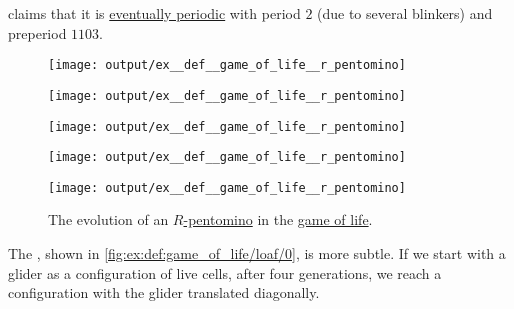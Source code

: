 \begin{example}
\begin{thmenum}
    \cite{ConwayLife:r_pentomino} claims that it is \hyperref[def:dynamical_system_eventual_periodicity]{eventually periodic} with period \( 2 \) (due to several blinkers) and preperiod \( 1103 \).

    \begin{figure}[!ht]
      \begin{subcaptionblock}{0.15\textwidth}
        \centering
        \texttt{[image: output/ex\_\_def\_\_game\_of\_life\_\_r\_pentomino]}
        \caption{\( t = 0 \)}\label{fig:ex:def:game_of_life/r_pentomino/0}
      \end{subcaptionblock}
      \hfill
      \begin{subcaptionblock}{0.15\textwidth}
        \centering
        \texttt{[image: output/ex\_\_def\_\_game\_of\_life\_\_r\_pentomino]}
        \caption{\( t = 1 \)}\label{fig:ex:def:game_of_life/r_pentomino/1}
      \end{subcaptionblock}
      \hfill
      \begin{subcaptionblock}{0.15\textwidth}
        \centering
        \texttt{[image: output/ex\_\_def\_\_game\_of\_life\_\_r\_pentomino]}
        \caption{\( t = 2 \)}\label{fig:ex:def:game_of_life/r_pentomino/2}
      \end{subcaptionblock}
      \hfill
      \begin{subcaptionblock}{0.15\textwidth}
        \centering
        \texttt{[image: output/ex\_\_def\_\_game\_of\_life\_\_r\_pentomino]}
        \caption{\( t = 3 \)}\label{fig:ex:def:game_of_life/r_pentomino/3}
      \end{subcaptionblock}
      \hfill
      \begin{subcaptionblock}{0.15\textwidth}
        \centering
        \texttt{[image: output/ex\_\_def\_\_game\_of\_life\_\_r\_pentomino]}
        \caption{\( t = 4 \)}\label{fig:ex:def:game_of_life/r_pentomino/4}
      \end{subcaptionblock}
      \caption{The evolution of an \hyperref[ex:def:game_of_life/r_pentomino]{\( R \)-pentomino} in the \hyperref[def:game_of_life]{game of life}.}\label{fig:ex:def:game_of_life/r_pentomino}
    \end{figure}

     The , shown in \cref{fig:ex:def:game_of_life/loaf/0}, is more subtle. If we start with a glider as a configuration of live cells, after four generations, we reach a configuration with the glider translated diagonally.


\end{thmenum}
\end{example}
